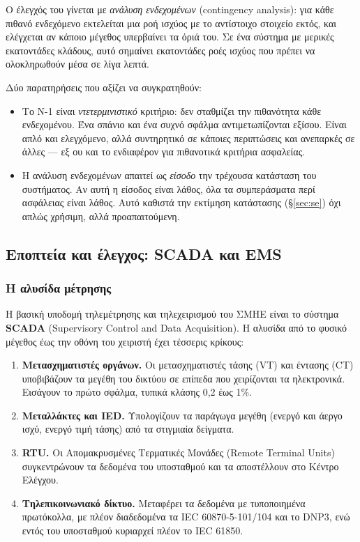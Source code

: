 Ο έλεγχός του γίνεται με \emph{ανάλυση ενδεχομένων} (contingency analysis): για κάθε
πιθανό ενδεχόμενο εκτελείται μια ροή ισχύος με το αντίστοιχο στοιχείο εκτός, και ελέγχεται
αν κάποιο μέγεθος υπερβαίνει τα όριά του. Σε ένα σύστημα με μερικές εκατοντάδες κλάδους,
αυτό σημαίνει εκατοντάδες ροές ισχύος που πρέπει να ολοκληρωθούν μέσα σε λίγα λεπτά.

Δύο παρατηρήσεις που αξίζει να συγκρατηθούν:

\begin{itemize}
\item Το N-1 είναι \emph{ντετερμινιστικό} κριτήριο: δεν σταθμίζει την πιθανότητα κάθε
      ενδεχομένου. Ένα σπάνιο και ένα συχνό σφάλμα αντιμετωπίζονται εξίσου. Είναι απλό και
      ελεγχόμενο, αλλά συντηρητικό σε κάποιες περιπτώσεις και ανεπαρκές σε άλλες — εξ ου
      και το ενδιαφέρον για πιθανοτικά κριτήρια ασφαλείας.
\item Η ανάλυση ενδεχομένων απαιτεί ως \emph{είσοδο} την τρέχουσα κατάσταση του συστήματος.
      Αν αυτή η είσοδος είναι λάθος, όλα τα συμπεράσματα περί ασφάλειας είναι λάθος. Αυτό
      καθιστά την εκτίμηση κατάστασης (§\ref{sec:se}) όχι απλώς χρήσιμη, αλλά προαπαιτούμενη.
\end{itemize}

\subsection{Εποπτεία και έλεγχος: SCADA και EMS}

\subsubsection*{Η αλυσίδα μέτρησης}

Η βασική υποδομή τηλεμέτρησης και τηλεχειρισμού του ΣΜΗΕ είναι το σύστημα \textbf{SCADA}
(Supervisory Control and Data Acquisition). Η αλυσίδα από το φυσικό μέγεθος έως την οθόνη
του χειριστή έχει τέσσερις κρίκους:

\begin{enumerate}
\item \textbf{Μετασχηματιστές οργάνων.} Οι μετασχηματιστές τάσης (VT) και έντασης (CT)
      υποβιβάζουν τα μεγέθη του δικτύου σε επίπεδα που χειρίζονται τα ηλεκτρονικά. Εισάγουν
      το πρώτο σφάλμα, τυπικά κλάσης 0,2 έως 1\%.
\item \textbf{Μεταλλάκτες και IED.} Υπολογίζουν τα παράγωγα μεγέθη (ενεργό και άεργο ισχύ,
      ενεργό τιμή τάσης) από τα στιγμιαία δείγματα.
\item \textbf{RTU.} Οι Απομακρυσμένες Τερματικές Μονάδες (Remote Terminal Units)
      συγκεντρώνουν τα δεδομένα του υποσταθμού και τα αποστέλλουν στο Κέντρο Ελέγχου.
\item \textbf{Τηλεπικοινωνιακό δίκτυο.} Μεταφέρει τα δεδομένα με τυποποιημένα πρωτόκολλα,
      με πλέον διαδεδομένα τα IEC 60870-5-101/104 και το DNP3, ενώ εντός του υποσταθμού
      κυριαρχεί πλέον το IEC 61850.
\end{enumerate}

